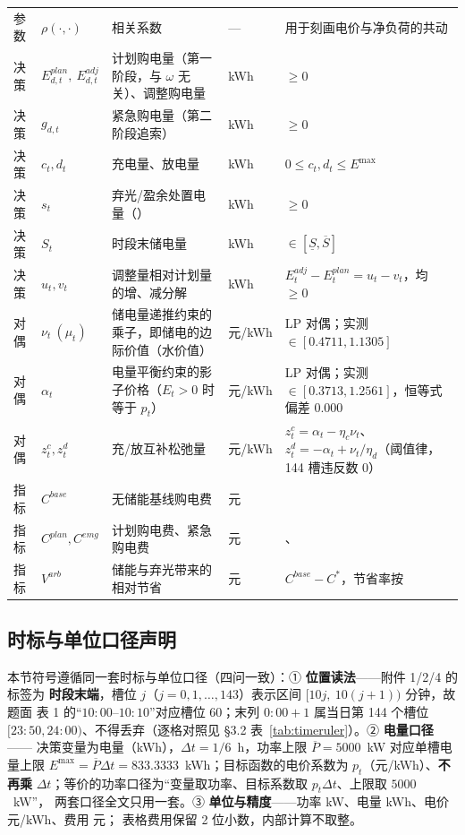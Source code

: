 \begin{table}[htbp]
\begin{tabularx}{\linewidth}{C{0.85cm} C{2.05cm} L{6.55cm} C{1.05cm} Y}
    参数 & \(\rho(\cdot,\cdot)\) & 相关系数 & --- & 用于刻画电价与净负荷的共动 \\
    决策 & \(E^{plan}_{d,t},\ E^{adj}_{d,t}\) & 计划购电量（第一阶段，与 \(\omega\) 无关）、调整购电量 & kWh & \(\ge0\) \\
    决策 & \(g_{d,t}\) & 紧急购电量（第二阶段追索） & kWh & \(\ge0\) \\
    决策 & \(c_t,d_t\) & 充电量、放电量 & kWh & \(0\le c_t,d_t\le E^{\max}\) \\
    决策 & \(s_t\) & 弃光/盈余处置电量（） & kWh & \(\ge0\) \\
    决策 & \(S_t\) & 时段末储电量 & kWh & \(\in[\underline S,\overline S]\) \\
    决策 & \(u_t,v_t\) & 调整量相对计划量的增、减分解 & kWh & \(E^{adj}_t-E^{plan}_t=u_t-v_t\)，均 \(\ge0\) \\
    对偶 & \(\nu_t\ (\mu_t)\) & 储电量递推约束的乘子，即储电的边际价值（水价值） & 元/kWh
      & LP 对偶；实测 \(\in[0.4711,1.1305]\) \\
    对偶 & \(\alpha_t\) & 电量平衡约束的影子价格（\(E_t>0\) 时等于 \(p_t\)） & 元/kWh
      & LP 对偶；实测 \(\in[0.3713,1.2561]\)，恒等式偏差 \(0.000\) \\
    对偶 & \(z^{c}_t,z^{d}_t\) & 充/放互补松弛量 & 元/kWh
      & \(z^{c}_t=\alpha_t-\eta_c\nu_t\)、\(z^{d}_t=-\alpha_t+\nu_t/\eta_d\)（阈值律，144 槽违反数 0） \\
    指标 & \(C^{base}\) & 无储能基线购电费 & 元 &  \\
    指标 & \(C^{plan},C^{emg}\) & 计划购电费、紧急购电费 & 元 & 、 \\
    指标 & \(V^{arb}\) & 储能与弃光带来的相对节省 & 元 & \(C^{base}-C^{*}\)，节省率按  \\
    \bottomrule
  \end{tabularx}
\end{table}

\subsection{时标与单位口径声明}
本节符号遵循同一套时标与单位口径（四问一致）：① \textbf{位置读法}——附件 1/2/4 的标签为
\textbf{时段末端}，槽位 \(j\)（\(j=0,1,\dots,143\)）表示区间 \([10j,\ 10(j+1))\) 分钟，故题面
表 1 的“\(10{:}00\)--\(10{:}10\)”对应槽位 60；末列 \(0{:}00{+}1\) 属当日第 144 个槽位
\([23{:}50,24{:}00)\)、不得丢弃（逐格对照见 \S3.2 表~\ref{tab:timeruler}）。② \textbf{电量口径}——
决策变量为电量（kWh），\(\Delta t=1/6\)~h，功率上限 \(\overline P=5000\)~kW 对应单槽电量上限
\(E^{\max}=\overline P\Delta t=833.3333\)~kWh；目标函数的电价系数为 \(p_t\)（元/kWh）、\textbf{不再乘}
\(\Delta t\)；等价的功率口径为“变量取功率、目标系数取 \(p_t\Delta t\)、上限取 \(5000\)~kW”，
两套口径全文只用一套。③ \textbf{单位与精度}——功率 kW、电量 kWh、电价 元/kWh、费用 元；
表格费用保留 2 位小数，内部计算不取整。
